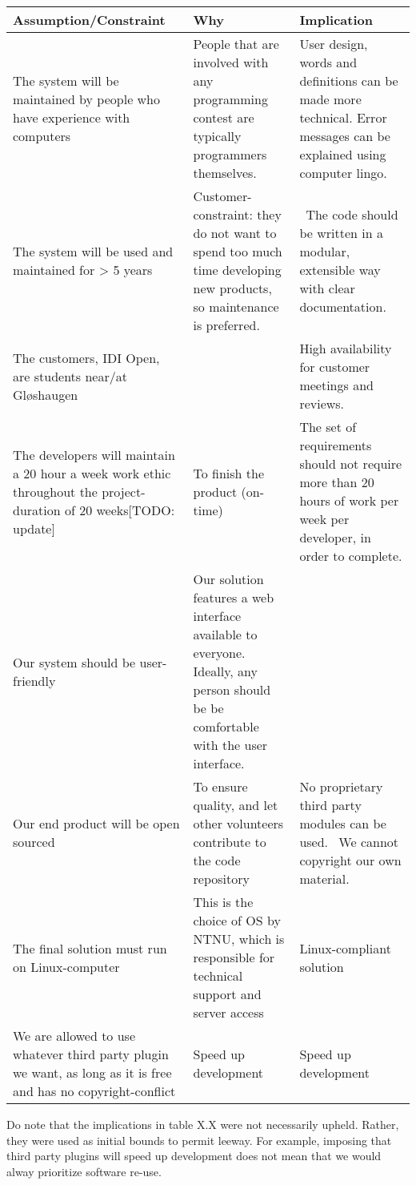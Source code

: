 \begin{table}
\tablehead{}
\begin{supertabular}{|m{0.33\textwidth}|m{0.33\textwidth}|m{0.33\textwidth}|}
\hline
Assumption/Constraint &
Why &
Implication\\\hline
The system will be maintained by people who have experience with
computers &
People that are involved with any programming contest are typically
programmers themselves. &
User design, words and definitions can be made more technical. Error
messages can be explained using computer lingo. \\\hline
The system will be used and maintained for {\textgreater} 5 years &
Customer{}-constraint: they do not want to spend too much time
developing new products, so maintenance is preferred. &
\ The code should be written in a modular, extensible way with clear
documentation.\\\hline
The customers, IDI Open, are students near/at Gl{\o}shaugen &
~
 &
High availability for customer meetings and reviews.\\\hline
The developers will maintain a 20 hour a week work ethic throughout the
project{}-duration of 20 weeks[TODO: update] &
To finish the product (on{}-time) &
The set of requirements should not require more than 20 hours of work
per week per developer, in order to complete.\\\hline
Our system should be user{}-friendly &
Our solution features a web interface available to everyone. Ideally,
any person should be be comfortable with the user interface. &
~
\\\hline
Our end product will be open sourced &
To ensure quality, and let other volunteers contribute to the code
repository &
No proprietary third party modules can be used. \ We cannot copyright
our own material. \\\hline
The final solution must run on Linux{}-computer &
This is the choice of OS by NTNU, which is responsible for technical
support and server access &
Linux{}-compliant solution\\\hline
We are allowed to use whatever third party plugin we want, as long as it
is free and has no copyright{}-conflict &
Speed up development &
Speed up development\\\hline
\end{supertabular}
\end{table}

Do note that the implications in table X.X were not necessarily upheld.
Rather, they were used as initial bounds to permit leeway. For example,
imposing that third party plugins will speed up development does not
mean that we would alway prioritize software re-use.

